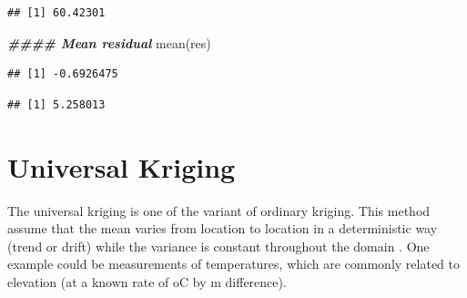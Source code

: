 \documentclass[
]{book}
\newenvironment{Shaded}{\begin{snugshade}}{\end{snugshade}}
\newcommand{\AttributeTok}[1]{\textcolor[rgb]{0.77,0.63,0.00}{#1}}
\newcommand{\ConstantTok}[1]{\textcolor[rgb]{0.00,0.00,0.00}{#1}}
\newcommand{\DecValTok}[1]{\textcolor[rgb]{0.00,0.00,0.81}{#1}}
\newcommand{\DocumentationTok}[1]{\textcolor[rgb]{0.56,0.35,0.01}{\textbf{\textit{#1}}}}
\newcommand{\FunctionTok}[1]{\textcolor[rgb]{0.00,0.00,0.00}{#1}}
\newcommand{\NormalTok}[1]{#1}
\newcommand{\OtherTok}[1]{\textcolor[rgb]{0.56,0.35,0.01}{#1}}
\newcommand{\SpecialCharTok}[1]{\textcolor[rgb]{0.00,0.00,0.00}{#1}}
\begin{document}
\begin{Shaded}
\end{Shaded}

\begin{verbatim}
## [1] 60.42301
\end{verbatim}

\begin{Shaded}
\begin{Highlighting}[]
\DocumentationTok{\#\#\#\# Mean residual}
\FunctionTok{mean}\NormalTok{(res)}
\end{Highlighting}
\end{Shaded}

\begin{verbatim}
## [1] -0.6926475
\end{verbatim}

\begin{Shaded}
\end{Shaded}

\begin{verbatim}
## [1] 5.258013
\end{verbatim}

\hypertarget{universal-kriging}{%
\section{Universal Kriging}\label{universal-kriging}}

The universal kriging is one of the variant of ordinary kriging. This method assume that the mean varies from location to location in a deterministic way (trend or drift) while the variance is constant throughout the domain \citep{matheron_traite_1962}. One example could be measurements of temperatures, which are commonly related to elevation (at a known rate of oC by m difference).
\end{document}
